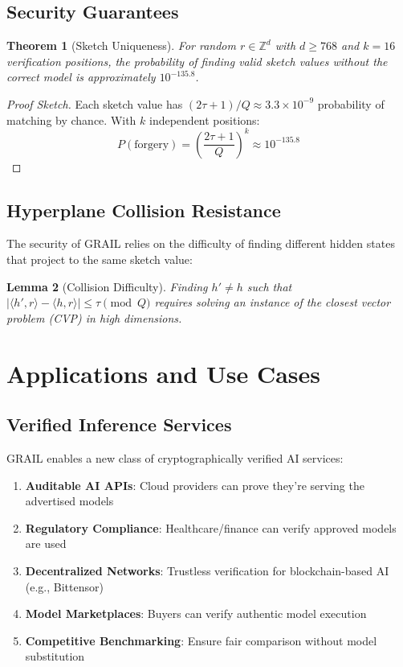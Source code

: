 \documentclass[11pt,a4paper]{article}
\newtheorem{theorem}{Theorem}
\newtheorem{lemma}[theorem]{Lemma}
\begin{document}
\subsection{Security Guarantees}

\begin{theorem}[Sketch Uniqueness]
For random $r \in \mathbb{Z}^d$ with $d \geq 768$ and $k = 16$ verification positions, the probability of finding valid sketch values without the correct model is approximately $10^{-135.8}$.
\end{theorem}

\begin{proof}[Proof Sketch]
Each sketch value has $(2\tau + 1)/Q \approx 3.3 \times 10^{-9}$ probability of matching by chance. With $k$ independent positions:
\begin{equation}
P(\text{forgery}) = \left(\frac{2\tau + 1}{Q}\right)^k \approx 10^{-135.8}
\end{equation}
\end{proof}

\subsection{Hyperplane Collision Resistance}

The security of GRAIL relies on the difficulty of finding different hidden states that project to the same sketch value:

\begin{lemma}[Collision Difficulty]
Finding $h' \neq h$ such that $|\langle h', r \rangle - \langle h, r \rangle| \leq \tau \pmod{Q}$ requires solving an instance of the closest vector problem (CVP) in high dimensions.
\end{lemma}

\section{Applications and Use Cases}

\subsection{Verified Inference Services}

GRAIL enables a new class of cryptographically verified AI services:
\begin{enumerate}
    \item \textbf{Auditable AI APIs}: Cloud providers can prove they're serving the advertised models
    \item \textbf{Regulatory Compliance}: Healthcare/finance can verify approved models are used
    \item \textbf{Decentralized Networks}: Trustless verification for blockchain-based AI (e.g., Bittensor)
    \item \textbf{Model Marketplaces}: Buyers can verify authentic model execution
    \item \textbf{Competitive Benchmarking}: Ensure fair comparison without model substitution
\end{enumerate}
\end{document}
